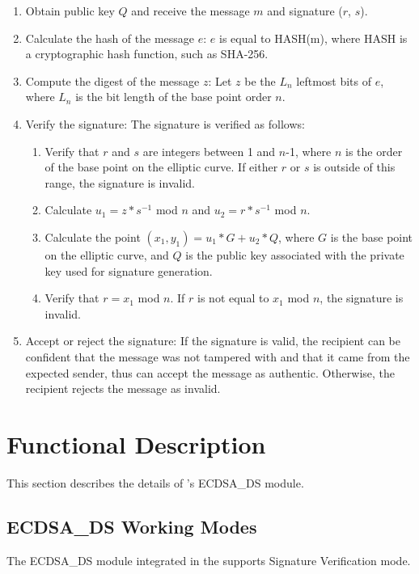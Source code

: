 \documentclass[main\_\_EN.tex]{subfiles}
\begin{document}
\begin{enumerate}
    \item Obtain public key $Q$ and receive the message $m$ and signature ($r$, $s$).
    \item Calculate the hash of the message $e$: $e$ is equal to HASH(m), where HASH is a cryptographic hash function, such as SHA-256.
    \item Compute the digest of the message $z$: Let $z$ be the $L_n$ leftmost bits of $e$, where $L_n$ is the bit length of the base point order $n$.
    \item Verify the signature: The signature is verified as follows:
        \begin{enumerate}
            \item Verify that $r$ and $s$ are integers between 1 and $n$-1, where $n$ is the order of the base point on the elliptic curve. If either $r$ or $s$ is outside of this range, the signature is invalid.
            \item Calculate $u_1 = z * s^{-1}$ mod $n$ and $u_2 = r * s^{-1}$ mod $n$.
            \item Calculate the point $(x_1, y_1) = u_1 * G + u_2 * Q$, where $G$ is the base point on the elliptic curve, and $Q$ is the public key associated with the private key used for signature generation.
            \item Verify that $r = x_1$ \textrm{mod} $n$. If $r$ is not equal to $x_1$ mod $n$, the signature is invalid.
        \end{enumerate}
    \item Accept or reject the signature: If the signature is valid, the recipient can be confident that the message was not tampered with and that it came from the expected sender, thus can accept the message as authentic. Otherwise, the recipient rejects the message as invalid.
\end{enumerate}

\section{Functional Description}

This section describes the details of \chipname{}'s ECDSA\_DS module.

\subsection{ECDSA\_DS Working Modes}

The ECDSA\_DS module integrated in the \chipname{} supports Signature Verification mode.
\end{document}
